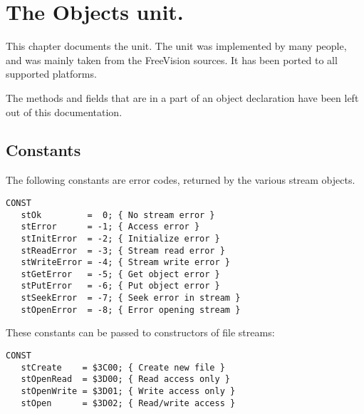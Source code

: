 %
%
%
%
%
\chapter{The Objects unit.}
\label{ch:objectsunit}

This chapter documents the  unit. The unit was implemented by
many people, and was mainly taken from the FreeVision sources. It has been 
ported to all supported platforms.

The methods and fields that are in a  part of an object
declaration have been left out of this documentation.

\section{Constants}
The following constants are error codes, returned by the various stream
objects.

\begin{verbatim}
CONST
   stOk         =  0; { No stream error }
   stError      = -1; { Access error }
   stInitError  = -2; { Initialize error }
   stReadError  = -3; { Stream read error }
   stWriteError = -4; { Stream write error }
   stGetError   = -5; { Get object error }
   stPutError   = -6; { Put object error }
   stSeekError  = -7; { Seek error in stream }
   stOpenError  = -8; { Error opening stream }
\end{verbatim}
These constants can be passed to constructors of file streams:
\begin{verbatim}
CONST
   stCreate    = $3C00; { Create new file }
   stOpenRead  = $3D00; { Read access only }
   stOpenWrite = $3D01; { Write access only }
   stOpen      = $3D02; { Read/write access }
\end{verbatim}


